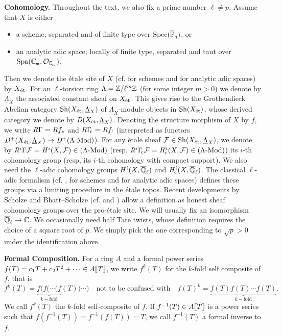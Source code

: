 \documentclass[../main.tex]{subfiles}
\begin{document}
\textbf{Cohomology.} 
Throughout the text, we also fix a prime number $\ell \neq p$.
Assume that $X$ is either 
\begin{itemize}
  \item a scheme; separated and of finite type over $\operatorname{Spec}({\overline {\mathbb{F}}_q})$, or
  \item an analytic adic space; locally of finite type, separated and taut over
    $\spa(\Cp, \cO_\Cp)$. 
\end{itemize}
Then we denote the \'etale site of $X$ (cf. \cite{LeiFuEtale} for schemes and
\cite{huber2013etale} for analytic adic spaces) by $X_{\textnormal{\'et}}$. For an
$\ell$-torsion ring $\Lambda = \mathbb{Z}/\ell^m \mathbb{Z}$ (for some integer $m>0$) we denote
by $\underline \Lambda_X$ the associated constant sheaf on $X_{\textnormal{\'et}}$. This gives
rise to the Grothendieck Abelian category $\mathrm{Sh}(X_{\textnormal{\'et}}, {\underline \Lambda_X})$ of
$\underline \Lambda_X$-module objects in $\mathrm{Sh}(X_{\textnormal{\'et}})$, whose derived category
we denote by $\mathit D(X_{\textnormal{\'et}}, \underline \Lambda_X)$. 
Denoting the structure morphism of $X$ by $f$, we write 
$\mathit R \Gamma = \mathit R f_*$ and $\mathit R \Gamma_{\hspace{-2pt}\mathrm{c}} = \mathit R f_!$ (interpreted as functors
$\mathit D^+(X_{\textnormal{\'et}}, \underline \Lambda_X) \to \mathit D^+{({\Lambda}\textnormal-\allowbreak\mathrm{Mod})}$).
For any ètale sheaf $\mathcal{F} \in \mathrm{Sh}(X_{\textnormal{\'et}}, \underline \Lambda_X)$, we denote 
by $\mathit R^i\Gamma\mathcal{F} = \mathit H^i(X, \mathcal{F}) \in {({\Lambda}\textnormal-\allowbreak\mathrm{Mod})}$ (resp. $\mathit R^i \Gamma_{\hspace{-2pt}\mathrm{c}} \mathcal{F} = 
\mathit H_{\mathrm{c}}^i(X, \mathcal{F}) \in {({\Lambda}\textnormal-\allowbreak\mathrm{Mod})}$) its $i$-th cohomology group (resp, its
$i$-th cohomology with compact support).
We also need the $\ell$-adic cohomology groups $\mathit H^i(X, {\overline {\mathbb{Q}}_\ell})$ 
and $\mathit H_{\mathrm{c}}^i(X, {\overline {\mathbb{Q}}_\ell})$. The classical $\ell$-adic formalism (cf. \cite{LeiFuEtale},
\cite{jannsen1988continuous} for schemes and \cite{huber1998comparison} for
analytic adic spaces) defines these groups via a limiting procedure in the 
\'etale topos. Recent developments by Scholze and Bhatt--Scholze (cf.
\cite{scholze2017etale} and \cite{bhattscholze2013pro}) allow a definition
as honest sheaf cohomology groups over the pro-\'etale site. 
We will usually fix an isomorphism ${\overline {\mathbb{Q}}_\ell} \to \mathbb{C}$. We occasionally need half Tate twists, whose definition requires the choice of a square root of $p$. We simply pick the one corresponding to $\sqrt p > 0$ under the identification above.

\textbf{Formal Composition.}
For a ring $A$ and a formal power series $f(T) = c_1 T + c_2 T^2 + \dots \in
A\llbracket T \rrbracket$, we write $f^k(T)$ for the $k$-fold self composite of $f$, that is
\begin{equation*}
  f^k(T) = \underbrace{f(f( \cdots (f}_{k-\text{fold}}(T)) \cdots) \quad \text{not to be confused with}
  \quad f(T)^k = \underbrace{f(T) f(T) \cdots f(T)}_{k-\text{fold}}.
\end{equation*}
We call $f^k(T)$ the $k$-fold self-composite of $f$. If $f^{-1}(T) \in A\llbracket T \rrbracket$
is a power series such that $f(f^{-1}(T)) = f^{-1}(f(T)) = T$, we call
$f^{-1}(T)$ a formal inverse to $f$.
\end{document}
